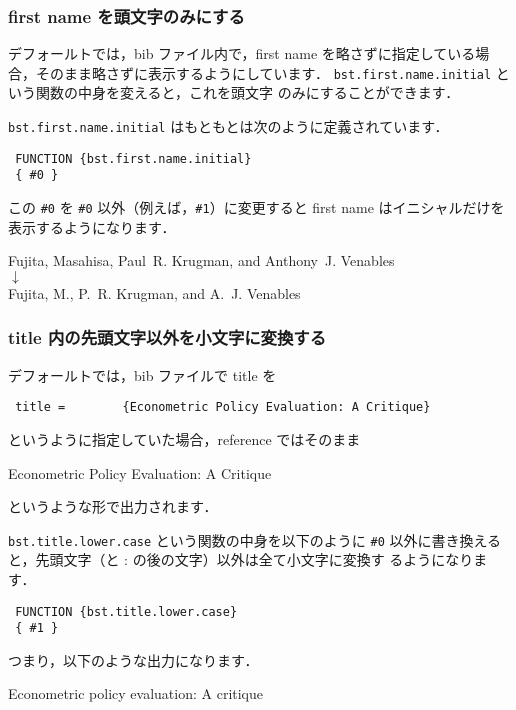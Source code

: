 \documentclass[article]{jlreq}
\begin{document}
\subsubsection{first name を頭文字のみにする}

デフォールトでは，bib ファイル内で，first name を略さずに指定している場
合，そのまま略さずに表示するようにしています．
\texttt{bst.first.name.initial} という関数の中身を変えると，これを頭文字
のみにすることができます．

\texttt{bst.first.name.initial} はもともとは次のように定義されています．
\begin{screen}
\begin{verbatim}
 FUNCTION {bst.first.name.initial}
 { #0 }
\end{verbatim}
\end{screen}
この \verb|#0| を \verb|#0| 以外（例えば，\verb|#1|）に変更すると
first name はイニシャルだけを表示するようになります．
\begin{center}
Fujita, Masahisa, Paul~R. Krugman, and Anthony~J. Venables \\
 $\downarrow$ \\
Fujita, M., P.~R. Krugman, and A.~J. Venables
\end{center}

\subsubsection{title 内の先頭文字以外を小文字に変換する}

デフォールトでは，bib ファイルで title を
\begin{center}
  \verb| title =        {Econometric Policy Evaluation: A Critique}|
\end{center}
というように指定していた場合，reference ではそのまま
\begin{center}
 Econometric Policy Evaluation: A Critique
\end{center}
というような形で出力されます．

\texttt{bst.title.lower.case} という関数の中身を以下のように \verb|#0| 
以外に書き換えると，先頭文字（と : の後の文字）以外は全て小文字に変換す
るようになります．
\begin{screen}
\begin{verbatim}
 FUNCTION {bst.title.lower.case}
 { #1 }
\end{verbatim}
\end{screen}

つまり，以下のような出力になります．
\begin{center}
 Econometric policy evaluation: A critique
\end{center}
\end{document}

